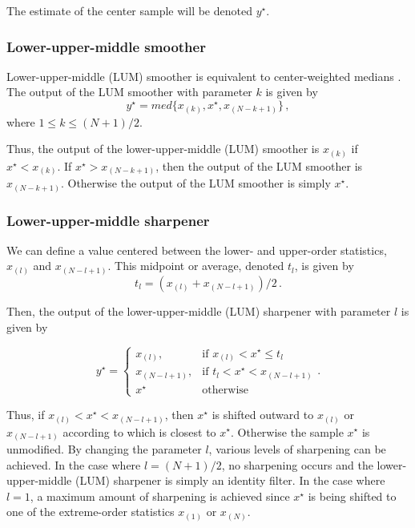 The estimate of the center sample will be denoted $y^{\star}$.

      \subsubsection{Lower-upper-middle smoother}

Lower-upper-middle (LUM) smoother is equivalent to 
center-weighted medians \cite[]{Justusson81}. The output of the LUM
smoother with parameter $k$ is given by
\begin{equation}
    y^{\star} = med \{x_{(k)},x^{\star},x_{(N-k+1)}\}\,,
  \label{eq:lumsm} 
\end{equation}
where $1 \le k \le (N+1)/2$.

Thus, the output of the lower-upper-middle (LUM)
smoother is $x_{(k)}$ if $x^{\star} < x_{(k)}$. If $x^{\star} > x_{(N-k+1)}$, then
the output of the LUM smoother is $x_{(N-k+1)}$. Otherwise the output
of the LUM smoother is simply $x^{\star}$.

     \subsubsection{Lower-upper-middle sharpener}

We can define a value centered between the lower- and upper-order
statistics, $x_{(l)}$ and $x_{(N-l+1)}$. This midpoint or average,
denoted $t_l$, is given by
\begin{equation}
   t_l = (x_{(l)}+x_{(N-l+1)})/2\,.
  \label{eq:lumsh1}
\end{equation}

Then, the output of the lower-upper-middle (LUM)
sharpener with parameter $l$ is given by 

\begin{equation}
   y^{\star} = \left\{ \begin{array}{ll} x_{(l)}, &
 \textrm{if $x_{(l)}< x^{\star} \le t_l$}\\ x_{(N-l+1)}, & \textrm{if
 $t_{l}< x^{\star} < x_{(N-l+1)}$}\\ x^{\star} & \textrm{otherwise}
\end{array} \right..
 \label{eq:lumsh2} 
\end{equation}

Thus, if $x_{(l)}<x^{\star}<x_{(N-l+1)}$, then $x^{\star}$ is shifted outward to
$x_{(l)}$ or $x_{(N-l+1)}$ according to which is closest to
$x^{\star}$. Otherwise the sample $x^{\star}$ is unmodified. By changing the
parameter $l$, various levels of sharpening can be achieved.  In the
case where $l=(N+1)/2$, no sharpening occurs and the
lower-upper-middle (LUM) sharpener is simply an
identity filter. In the case where $l=1$, a maximum amount of
sharpening is achieved since $x^{\star}$ is being shifted to one of the
extreme-order statistics $x_{(1)}$ or $x_{(N)}$.

